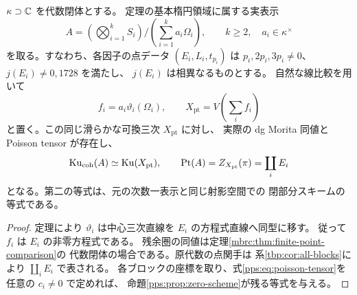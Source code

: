 \begin{corollary}[基本満支持型に対する同時比較]
\label{pps:cor:simultaneous-comparison}
$\kappa\supset\mathbb C$ を代数閉体とする。
定理の基本楕円領域に属する実表示
\[
 A=\left(\bigotimes_{i=1}^kS_i\right)
       \Big/\left(\sum_{i=1}^ka_i\Omega_i\right),
 \qquad k\ge2,\quad a_i\in\kappa^\times
\]
を取る。すなわち、各因子の点データ $(E_i,L_i,t_{p_i})$ は
$p_i,2p_i,3p_i\ne0$、$j(E_i)\ne0,1728$ を満たし、
$j(E_i)$ は相異なるものとする。
自然な線比較を用いて
\begin{equation}\label{pps:eq:point-target}
 f_i=a_i\vartheta_i(\Omega_i),\qquad
 X_{\mathrm{pt}}=V\left(\sum_i f_i\right)
\end{equation}
と置く。この同じ滑らかな可換三次 $X_{\mathrm{pt}}$ に対し、
実際の dg Morita 同値と Poisson tensor が存在し、
\begin{equation}\label{pps:eq:simultaneous}
 \operatorname{Ku}_{\mathrm{coh}}(A)\simeq\operatorname{Ku}(X_{\mathrm{pt}}),\qquad
 \operatorname{Pt}(A)=Z_{X_{\mathrm{pt}}}(\pi)
          =\coprod_iE_i
\end{equation}
となる。第二の等式は、元の次数一表示と同じ射影空間での
閉部分スキームの等式である。
\end{corollary}

\begin{proof}
定理により
$\vartheta_i$ は中心三次直線を $E_i$ の方程式直線へ同型に移す。
従って $f_i$ は $E_i$ の非零方程式である。
残余圏の同値は定理\ref{mbrc:thm:finite-point-comparison}の
代数閉体の場合である。原代数の点関手は
系\ref{tbp:cor:all-blocks}により $\coprod_iE_i$ で表される。
各ブロックの座標を取り、式\eqref{pps:eq:poisson-tensor}を
任意の $c_i\ne0$ で定めれば、
命題\ref{pps:prop:zero-scheme}が残る等式を与える。
\end{proof}

